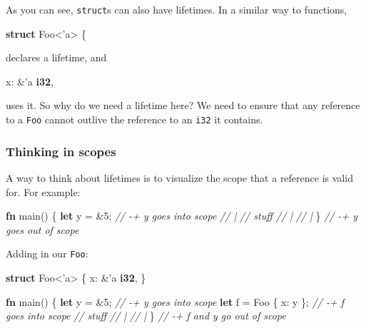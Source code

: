 \documentclass[a4paper,]{book}
\newenvironment{Shaded}{\begin{snugshade}}{\end{snugshade}}
\newcommand{\KeywordTok}[1]{\textcolor[rgb]{0.13,0.29,0.53}{\textbf{{#1}}}}
\newcommand{\DecValTok}[1]{\textcolor[rgb]{0.00,0.00,0.81}{{#1}}}
\newcommand{\CommentTok}[1]{\textcolor[rgb]{0.56,0.35,0.01}{\textit{{#1}}}}
\newcommand{\OtherTok}[1]{\textcolor[rgb]{0.56,0.35,0.01}{{#1}}}
\newcommand{\NormalTok}[1]{{#1}}
\begin{document}
As you can see, \texttt{struct}s can also have lifetimes. In a similar
way to functions,

\begin{Shaded}
\begin{Highlighting}[]
\KeywordTok{struct} \NormalTok{Foo<}\OtherTok{'a}\NormalTok{> \{}
\end{Highlighting}
\end{Shaded}

declares a lifetime, and

\begin{Shaded}
\begin{Highlighting}[]
\NormalTok{x: &}\OtherTok{'a} \KeywordTok{i32}\NormalTok{,}
\end{Highlighting}
\end{Shaded}

uses it. So why do we need a lifetime here? We need to ensure that any
reference to a \texttt{Foo} cannot outlive the reference to an
\texttt{i32} it contains.

\subsubsection{Thinking in scopes}\label{thinking-in-scopes-1}

A way to think about lifetimes is to visualize the scope that a
reference is valid for. For example:

\begin{Shaded}
\begin{Highlighting}[]
\KeywordTok{fn} \NormalTok{main() \{}
    \KeywordTok{let} \NormalTok{y = &}\DecValTok{5}\NormalTok{;     }\CommentTok{// -+ y goes into scope}
                    \CommentTok{//  |}
    \CommentTok{// stuff        //  |}
                    \CommentTok{//  |}
\NormalTok{\}                   }\CommentTok{// -+ y goes out of scope}
\end{Highlighting}
\end{Shaded}

Adding in our \texttt{Foo}:

\begin{Shaded}
\begin{Highlighting}[]
\KeywordTok{struct} \NormalTok{Foo<}\OtherTok{'a}\NormalTok{> \{}
    \NormalTok{x: &}\OtherTok{'a} \KeywordTok{i32}\NormalTok{,}
\NormalTok{\}}

\KeywordTok{fn} \NormalTok{main() \{}
    \KeywordTok{let} \NormalTok{y = &}\DecValTok{5}\NormalTok{;           }\CommentTok{// -+ y goes into scope}
    \KeywordTok{let} \NormalTok{f = Foo \{ x: y \}; }\CommentTok{// -+ f goes into scope}
    \CommentTok{// stuff              //  |}
                          \CommentTok{//  |}
\NormalTok{\}                         }\CommentTok{// -+ f and y go out of scope}
\end{Highlighting}
\end{Shaded}
\end{document}
